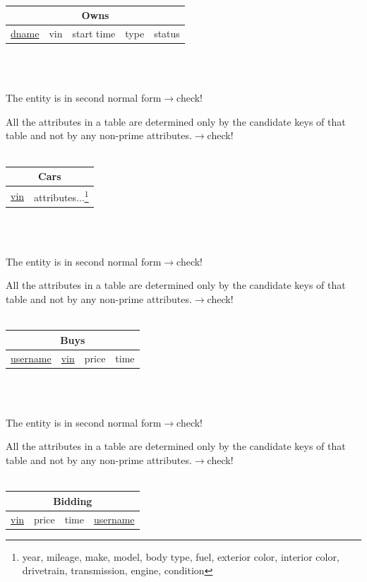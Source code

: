 \documentclass[12pt]{article}
\begin{document}
~\\
\begin{tabularx}{\textwidth}{|X|X|X|X|X|}
\hline
\multicolumn{5}{|c|}{Owns}\\\hline
\underline{dname} & vin & start time & type & status\\\hline
\end{tabularx}
~\\~\\
\par The entity is in second normal form\hfill $\rightarrow$check!
\par All the attributes in a table are determined only by the candidate keys of that table and not by any non-prime attributes.\hfill $\rightarrow$check!\\
~\\
\begin{tabularx}{\textwidth}{|X|X|}
\hline
\multicolumn{2}{|c|}{Cars}\\\hline
\underline{vin} & attributes...\footnote{year, mileage, make, model, body type, fuel, exterior color, interior color, drivetrain, transmission, engine, condition}\\\hline
\end{tabularx}
~\\~\\
\par The entity is in second normal form\hfill $\rightarrow$check!
\par All the attributes in a table are determined only by the candidate keys of that table and not by any non-prime attributes.\hfill $\rightarrow$check!\\
~\\
\begin{tabularx}{\textwidth}{|X|X|X|X|}
\hline
\multicolumn{4}{|c|}{Buys}\\\hline
\underline{username} & \underline{vin} & \cellcolor{green!25}price & \cellcolor{green!25}time\\\hline
\end{tabularx}
~\\~\\
\par The entity is in second normal form\hfill $\rightarrow$check!
\par All the attributes in a table are determined only by the candidate keys of that table and not by any non-prime attributes.\hfill $\rightarrow$check!\\
~\\
\begin{tabularx}{\textwidth}{|X|X|X|X|}
\hline
\multicolumn{4}{|c|}{\cellcolor{green!25}Bidding}\\\hline
\cellcolor{green!25}\underline{vin} & \cellcolor{green!25}price & \cellcolor{green!25}time & \cellcolor{green!25}\underline{username}\\\hline
\end{tabularx}
\end{document}
